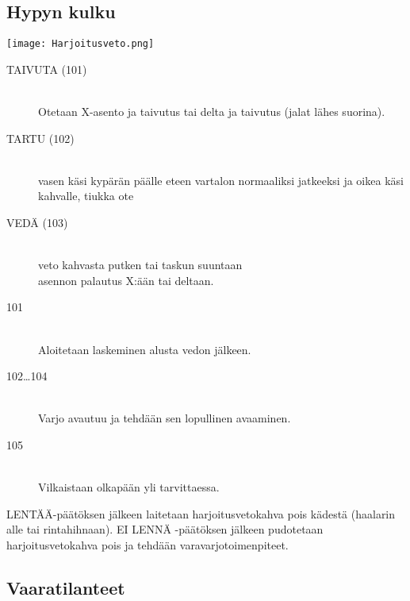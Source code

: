 \begin{multicols}{2}
\subsection{ Hypyn kulku }
\label{pl-alkeiskoulutuksen-suoritukset-hypyn-kulku}


\begin{Figure}\centering\texttt{[image: Harjoitusveto.png]}\end{Figure}  

\begin{description}
\item[TAIVUTA (101)] \hfill \\ 
Otetaan X-asento ja taivutus tai delta ja taivutus (jalat lähes suorina). \hfill \\ 
\item[TARTU (102)] \hfill \\ 
vasen käsi kypärän päälle eteen vartalon normaaliksi jatkeeksi ja oikea käsi kahvalle, tiukka ote \hfill \\ 
\item[VEDÄ (103)] \hfill \\ 
veto kahvasta putken tai taskun suuntaan \hfill \\ 
asennon palautus X:ään tai deltaan. \hfill \\ 
\item[101] \hfill \\ 
Aloitetaan laskeminen alusta vedon jälkeen. \hfill \\ 
\end{description}
\begin{description}
\item[102…104] \hfill \\ 
Varjo avautuu ja tehdään sen lopullinen avaaminen. \hfill \\ 
\end{description}
\begin{description}
\item[105] \hfill \\ 
Vilkaistaan olkapään yli tarvittaessa. \hfill \\ 
\end{description}

LENTÄÄ-päätöksen jälkeen laitetaan harjoitusvetokahva pois kädestä (haalarin alle tai rintahihnaan). EI LENNÄ -päätöksen jälkeen pudotetaan harjoitusvetokahva pois ja tehdään varavarjotoimenpiteet. 

\subsection{ Vaaratilanteet }
\label{pl-alkeiskoulutuksen-suoritukset-vaaratilanteet}


\end{multicols}

